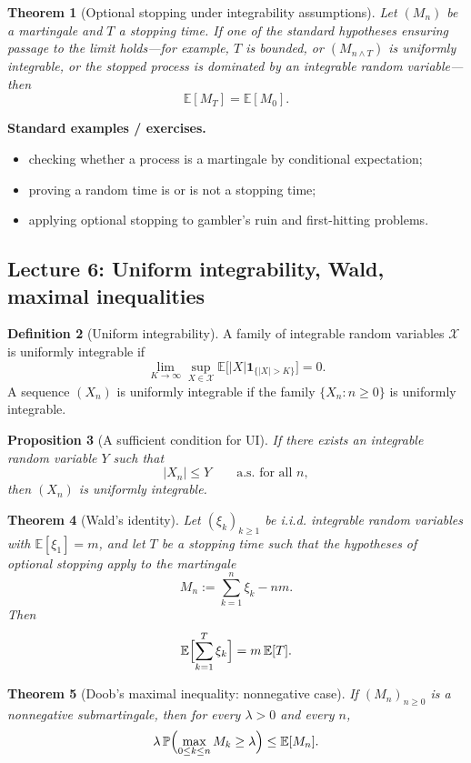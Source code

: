 \documentclass[11pt]{article}
\newtheorem{theorem}{Theorem}[section]
\newtheorem{proposition}[theorem]{Proposition}
\theoremstyle{definition}
\newtheorem{definition}[theorem]{Definition}
\begin{document}
\begin{theorem}[Optional stopping under integrability assumptions]
Let $(M_n)$ be a martingale and $T$ a stopping time. If one of the standard hypotheses ensuring passage to the limit holds---for example, $T$ is bounded, or $(M_{n\wedge T})$ is uniformly integrable, or the stopped process is dominated by an integrable random variable---then
\[
\mathbb E[M_T]=\mathbb E[M_0].
\]
\end{theorem}

\textbf{Standard examples / exercises.}
\begin{itemize}[leftmargin=2em]
    \item checking whether a process is a martingale by conditional expectation;
    \item proving a random time is or is not a stopping time;
    \item applying optional stopping to gambler's ruin and first-hitting problems.
\end{itemize}

\subsection{Lecture 6: Uniform integrability, Wald, maximal inequalities}

\begin{definition}[Uniform integrability]
A family of integrable random variables $\mathcal X$ is uniformly integrable if
\[
\lim_{K\to\infty}\sup_{X\in\mathcal X}\mathbb E\bigl[|X|\mathbf 1_{\{|X|>K\}}\bigr]=0.
\]
A sequence $(X_n)$ is uniformly integrable if the family $\{X_n:n\ge 0\}$ is uniformly integrable.
\end{definition}

\begin{proposition}[A sufficient condition for UI]
If there exists an integrable random variable $Y$ such that
\[
|X_n|\le Y \qquad \text{a.s. for all } n,
\]
then $(X_n)$ is uniformly integrable.
\end{proposition}

\begin{theorem}[Wald's identity]
Let $(\xi_k)_{k\ge 1}$ be i.i.d. integrable random variables with $\mathbb E[\xi_1]=m$, and let $T$ be a stopping time such that the hypotheses of optional stopping apply to the martingale
\[
M_n:=\sum_{k=1}^n \xi_k - nm.
\]
Then
\[
\mathbb E\Bigl[\sum_{k=1}^{T}\xi_k\Bigr]=m\,\mathbb E[T].
\]
\end{theorem}

\begin{theorem}[Doob's maximal inequality: nonnegative case]
If $(M_n)_{n\ge 0}$ is a nonnegative submartingale, then for every $\lambda>0$ and every $n$,
\[
\lambda\,\mathbb P\Bigl(\max_{0\le k\le n} M_k\ge \lambda\Bigr)
\le \mathbb E[M_n].
\]
\end{theorem}
\end{document}

